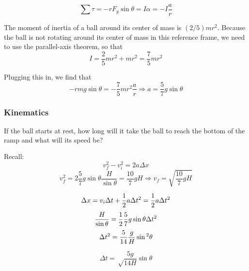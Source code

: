 $$\sum\tau = -rF_g\sin\theta = I\alpha = -I\frac{a}{r}$$

The moment of inertia of a ball around its center of mass is $(2/5)mr^2$. Because the ball is not rotating around its center of mass in this reference frame, we need to use the parallel-axis theorem, so that
$$I = \frac{2}{5}mr^2 + mr^2 = \frac{7}{5}mr^2$$

Plugging this in, we find that
$$-rmg\sin\theta = -\frac{7}{5}mr^2\frac{a}{r} \Rightarrow \boxed{a = \frac{5}{7}g\sin\theta}$$

\subsubsection*{Kinematics}
If the ball starts at rest, how long will it take the ball to reach the bottom of the ramp and what will its speed be?

Recall:\\
$$v_f^2-v_i^2=2a\Delta{x}$$
$$v_f^2=2\frac{5}{7}g\sin\theta\frac{H}{\sin\theta}=\frac{10}{7}gH\Rightarrow \boxed{v_f=\sqrt{\frac{10}{7}gH}}$$


$$\Delta x=v_i\Delta{t}+\frac{1}{2}a\Delta{t}^2=\frac{1}{2}a\Delta{t}\displaystyle^2$$
$$\frac{H}{\sin\theta}=\frac{1}{2}\frac{5}{7}g\sin\theta\Delta{t}\displaystyle^2$$
$$\Delta{t}\displaystyle^2=\frac{5}{14}\frac{g}{H}\sin\displaystyle^2\theta$$

$$\boxed{\Delta{t}=\sqrt\frac{5g}{14H}\sin\theta}$$


\clearpage

